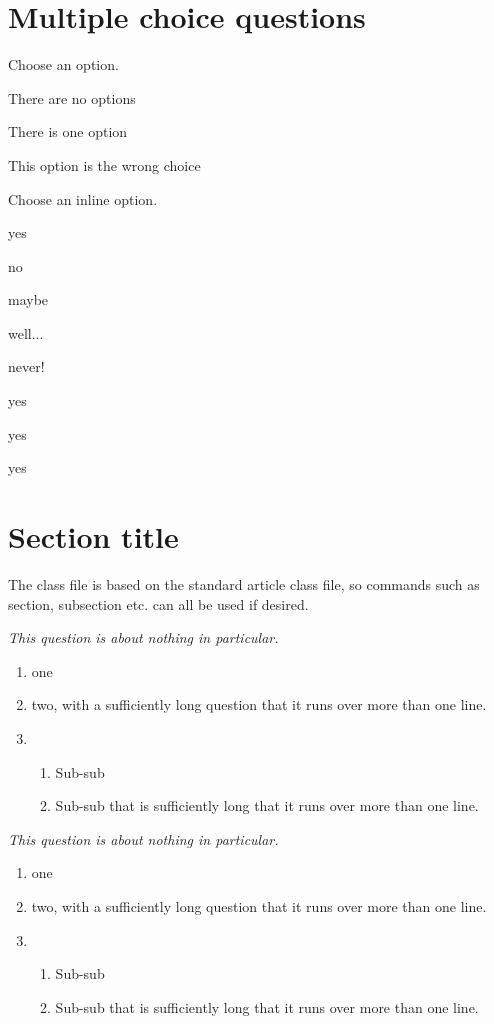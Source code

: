 \documentclass{ouexam}
\begin{document}
\section{Multiple choice questions}


\question
Choose an option.
\begin{options}
\item There are no options
\item There is one option
\item This option is the wrong choice
\end{options}


\question
Choose an inline option.
\begin{inlineoptions}{5} %
\item yes
\item no
\item maybe
\item well...
\item never!
\item yes
\item yes
\item yes
\noitem %
\noitem
\end{inlineoptions}

\section{Section title}

The class file is based on the standard article class file, so commands such as section, subsection etc. can all be used if desired.



\question
\emph{This question is about nothing in particular.}
\begin{enumerate}
\item one
\item two, with a sufficiently long question that it runs over more than one line.
\item 
\begin{enumerate}
\item Sub-sub
\item Sub-sub that is sufficiently long that it runs over more than one line.
\end{enumerate}
\end{enumerate}



\question
\emph{This question is about nothing in particular.}
\begin{enumerate}
\item one
\item two, with a sufficiently long question that it runs over more than one line.
\item 
\begin{enumerate}
\item Sub-sub
\item Sub-sub that is sufficiently long that it runs over more than one line.
\end{enumerate}
\end{enumerate}
\end{document}
